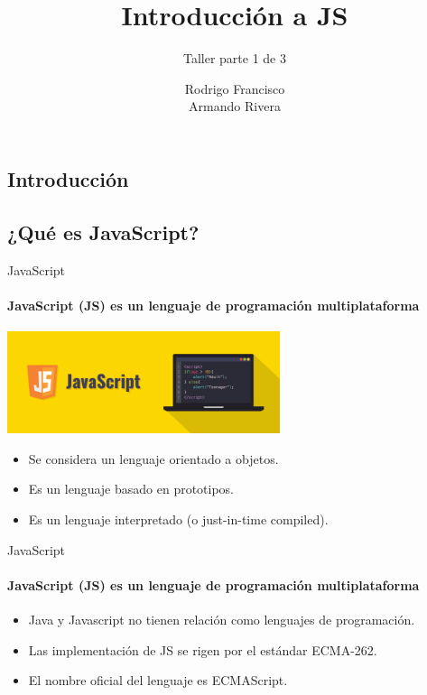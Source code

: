 \documentclass[aspectratio=169]{beamer}
\title{Introducción a JS} %
\subtitle{Taller parte 1 de 3} %
\author{
  Rodrigo Francisco \\
  Armando Rivera
}
\begin{document}
  \shorthandoff{-}
  \frame[c]{\maketitle}


  \begin{darkframes}
    \section{Introducción}
    \subsection{¿Qué es JavaScript?}
    \begin{frame}{JavaScript}
      \framesubtitle{\alert{JavaScript (JS) es un lenguaje de programación} multiplataforma}%
      \begin{center}
        \includegraphics[width=8cm]{download}
      \end{center}
      \begin{itemize}
        \item Se considera un lenguaje orientado a objetos.
        \item Es un lenguaje basado en prototipos.
        \item Es un lenguaje interpretado (o just-in-time compiled).
      \end{itemize}
    \end{frame}


    \begin{frame}{JavaScript}
      \framesubtitle{\alert{JavaScript (JS) es un lenguaje de programación} multiplataforma}%
      \begin{itemize}
        \item Java y Javascript no tienen relación como lenguajes de programación.
        \item Las implementación de JS se rigen por el estándar ECMA-262.
        \item El nombre oficial del lenguaje es ECMAScript.
      \end{itemize}
    \end{frame}


\end{darkframes}
\end{document}
